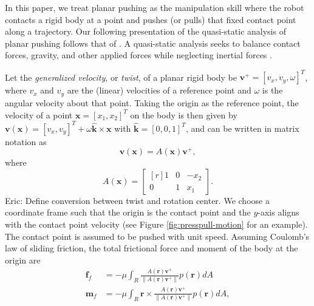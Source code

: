 \documentclass[conference]{IEEEtran}
\DeclareMathOperator{\sign}{\text{sgn}}
\newcommand{\EH}[1]{{\color{blue} {Eric: {#1}}  }}
\begin{document}
In this paper, we treat planar pushing as the manipulation skill where
the robot contacts a rigid body at a point and pushes (or pulls) that
fixed contact point along a trajectory.
Our following presentation of the quasi-static analysis of planar
pushing follows that of \cite{alexander1993bounds, Mason}. A
quasi-static analysis seeks to balance contact forces, gravity, and
other applied forces while neglecting inertial forces \cite{Mason}.

Let the \textit{generalized velocity}, or \textit{twist}, of a planar
rigid body be $\mathbf{v}^+ = [v_x, v_y, \omega]^T$, where $v_x$ and
$v_y$ are the (linear) velocities of a reference point and $\omega$ is
the angular velocity about that point. Taking the origin as the
reference point, the velocity of a point $\mathbf{x} = [x_1,x_2]^T$ on
the body is then given by
$\mathbf{v}(\mathbf{x}) = [v_x, v_y]^T + \omega\hat{\mathbf{k}} \times
\mathbf{x}$
with $\hat{\mathbf{k}} = [0,0,1]^T$, and can be written in matrix
notation as
\begin{equation} \label{eq:generalized-velocity}
\mathbf{v}(\mathbf{x}) = A(\mathbf{x})\mathbf{v}^+,
\end{equation}
where
\begin{equation}
  A(\mathbf{x}) = 
  \begin{bmatrix*}[r]
    1 & 0 & -x_2 \\
    0 & 1 &  x_1
  \end{bmatrix*}.
\end{equation}
\EH{Define conversion between twist and rotation center.}  We choose a
coordinate frame such that the origin is the contact point and the
$y$-axis aligns with the contact point velocity (see Figure
\ref{fig:presspull-motion} for an example). The contact point is
assumed to be pushed with unit speed. Assuming Coulomb's law of
sliding friction, the total frictional force and moment of the body at
the origin are
\begin{align}
  \mathbf{f}_f &= -\mu\int_{R}\frac{A(\mathbf{r})\mathbf{v}^+}{\lVert A(\mathbf{r})\mathbf{v}^+ \rVert} p(\mathbf{r}) dA \label{eq:force-at-contact} \\
  \mathbf{m}_f &= -\mu\int_{R}\mathbf{r}\times\frac{A(\mathbf{r})\mathbf{v}^+}{\lVert A(\mathbf{r})\mathbf{v}^+ \rVert} p(\mathbf{r}) dA, \label{eq:moment-at-contact}
\end{align}
\end{document}
